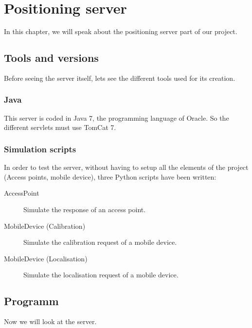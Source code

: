 \chapter{Positioning server}

In this chapter, we will speak about the positioning server part of our project. 

    \section{Tools and versions}

Before seeing the server itself, lets see the different tools used for its
creation.

        \subsection{Java}

This server is coded in Java 7, the programming language of Oracle. So the
different servlets must use TomCat 7.


        \subsection{Simulation scripts}

In order to test the server, without having to setup all the elements of the
project (Access points, mobile device), three Python scripts have been written:

\begin{description}
    \item [AccessPoint] Simulate the response of an access point.
    \item [MobileDevice (Calibration)] Simulate the calibration request of a
        mobile device.
    \item [MobileDevice (Localisation)] Simulate the localisation request of a
        mobile device.
\end{description}

    \section{Programm}

Now we will look at the server.

